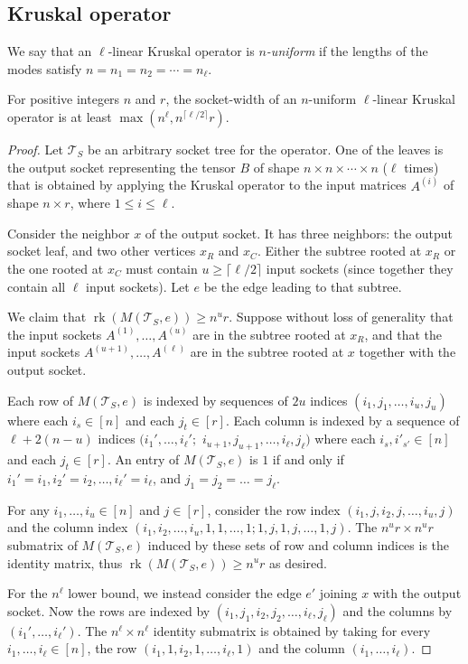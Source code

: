\documentclass{toc}
\newcommand{\rk}{\ensuremath{\operatorname{rk}}}
\newcommand{\ts}{\ensuremath{\mathcal{T}_S}}
\begin{document}
\subsection{Kruskal operator}

We say that an $\ell$-linear Kruskal operator is \emph{$n$-uniform} if
the lengths of the modes satisfy $n=n_1=n_2=\cdots=n_\ell$.

\begin{lemma}
For positive integers $n$ and $r$, the socket-width of an $n$-uniform $\ell$-linear Kruskal operator is at least $\max\left(n^{\ell}, n^{\lceil\ell/2\rceil}r\right)$.
\end{lemma}
\begin{proof}
  Let $\ts$ be an arbitrary socket tree for the
  operator.  One of the leaves is the output socket representing the
  tensor $B$ of shape $n \times n \times \cdots \times n$ ($\ell$
  times) that is obtained by applying the Kruskal operator to the input matrices
  $A^{(i)}$ of shape $n \times r$, where $1 \le i \le \ell$.

  Consider the neighbor $x$ of the output socket.  It has three
  neighbors: the output socket leaf, and two other vertices $x_R$ and
  $x_C$.  Either the subtree rooted at $x_R$ or the one rooted at $x_C$
  must contain $u \geq \lceil \ell/2 \rceil$ input sockets (since
  together they contain all $\ell$ input sockets).  Let $e$ be the
  edge leading to that subtree.

  We claim that $\rk(M(\ts, e)) \ge n^u r$.  Suppose without loss of
  generality that the input sockets $A^{(1)}, \ldots, A^{(u)}$ are in
  the subtree rooted at $x_R$, and that the input sockets $A^{(u+1)},
  \ldots, A^{(\ell)}$ are in the subtree rooted at $x$ together with
  the output socket.

  Each row of $M(\ts, e)$ is indexed by sequences of $2u$ indices $(i_1, j_1, \ldots, i_u, j_u)$ where each
  $i_s \in [n]$ and each $j_t \in [r]$. Each column is indexed by
  a sequence of $\ell + 2(n-u)$ indices $(i_1', \ldots, i_\ell';$ $
  i_{u+1}, j_{u+1}, \ldots, i_{\ell}, j_{\ell})$ where each $i_s, i'_{s'} \in [n]$
  and each $j_t \in [r]$.  An entry of $M(\ts, e)$ is $1$ if
  and only if $i_1' = i_1, i_2' = i_2, \ldots, i_\ell' = i_\ell$, and
  $j_1 = j_2 = \ldots = j_\ell$.

  For any $i_1, \ldots, i_u \in [n]$ and $j \in [r]$, consider the row index $(i_1, j, i_2, j, \ldots, i_u, j)$ and the column
  index $(i_1, i_2, \ldots, i_u, 1, 1, \ldots, 1; 1, j, 1, j, \ldots,
  1, j)$.  The
  $n^u r \times n^ur$ submatrix of $M(\ts, e)$ induced by these sets of
  row and column indices is the identity matrix, thus $\rk(M(\ts, e))
  \ge n^u r$ as desired.

  For the $n^{\ell}$ lower bound, we
  instead consider the edge $e'$ joining $x$ with the output socket.
  Now the rows are indexed by $(i_1, j_1, i_2, j_2, \ldots, i_\ell, j_\ell)$  and the
  columns by $(i_1', \ldots, i_\ell')$.  The
  $n^\ell \times n^\ell$ identity submatrix is obtained by taking for
  every $i_1, \ldots, i_\ell \in [n]$, the row $(i_1, 1, i_2, 1, \ldots, i_\ell, 1)$ and the column $(i_1, \ldots, i_\ell)$.
\end{proof}
\end{document}

